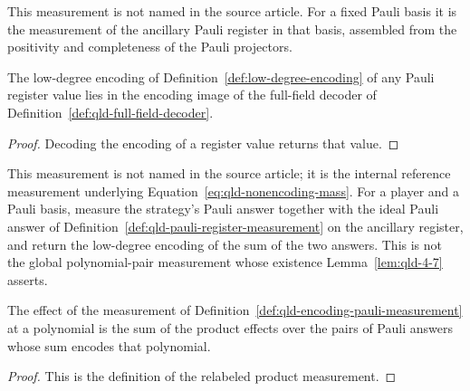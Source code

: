 	\begin{definition}
		\label{def:qld-pauli-register-measurement}
		\leanok
		This measurement is not named in the source article. For a fixed Pauli
		basis it is the measurement of the ancillary Pauli register in that basis,
		assembled from the positivity and completeness of the Pauli projectors.
	\end{definition}

	\begin{lemma}
		\label{lem:qld-is-encoding-encoding-poly}
		\leanok
		The low-degree encoding of Definition~\ref{def:low-degree-encoding} of any
		Pauli register value lies in the encoding image of the full-field decoder
		of Definition~\ref{def:qld-full-field-decoder}.
	\end{lemma}
	\begin{proof}
		\leanok
		Decoding the encoding of a register value returns that value.
	\end{proof}

	\begin{definition}
		\label{def:qld-encoding-pauli-measurement}
		\leanok
		This measurement is not named in the source article; it is the internal
		reference measurement underlying Equation~\eqref{eq:qld-nonencoding-mass}.
		For a player and a Pauli basis, measure the strategy's Pauli answer
		together with the ideal Pauli answer of
		Definition~\ref{def:qld-pauli-register-measurement} on the ancillary
		register, and return the low-degree encoding of the sum of the two answers.
		This is not the global polynomial-pair measurement whose existence
		Lemma~\ref{lem:qld-4-7} asserts.
	\end{definition}

	\begin{lemma}
		\label{lem:qld-encoding-pauli-effect}
		\leanok
		The effect of the measurement of
		Definition~\ref{def:qld-encoding-pauli-measurement} at a polynomial is the
		sum of the product effects over the pairs of Pauli answers whose sum
		encodes that polynomial.
	\end{lemma}
	\begin{proof}
		\leanok
		This is the definition of the relabeled product measurement.
	\end{proof}

